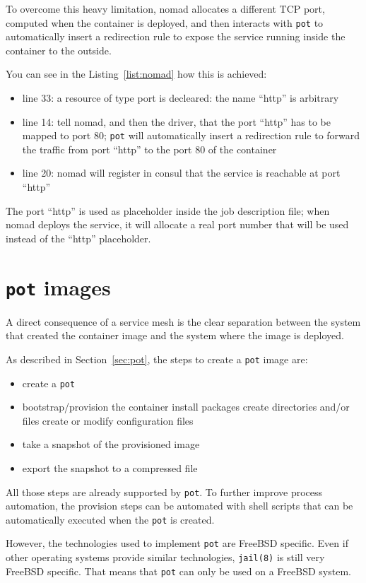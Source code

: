 \documentclass[conference,a4paper,11pt]{IEEEtran}
\begin{document}
To overcome this heavy limitation, nomad allocates a different TCP port, computed when the container is deployed, and then interacts with \texttt{pot} to automatically insert a redirection rule to expose the service running inside the container to the outside.

You can see in the Listing~\ref{list:nomad} how this is achieved:
\begin{itemize}
	\item line 33: a resource of type port is decleared: the name ``http'' is arbitrary
	\item line 14: tell nomad, and then the driver, that the port ``http'' has to be mapped to port 80; \texttt{pot} will automatically insert a redirection rule to forward the traffic from port ``http'' to the port 80 of the container
	\item line 20: nomad will register in consul that the service is reachable at port ``http''
\end{itemize}
The port ``http'' is used as placeholder inside the job description file; when nomad deploys the service, it will allocate a real port number that will be used instead of the ``http'' placeholder.

\section{\texttt{pot} images}\label{sec:Images}
A direct consequence of a service mesh is the clear separation between the system that created the container image and the system where the image is deployed.

As described in Section~\ref{sec:pot}, the steps to create a \texttt{pot} image are:
\begin{itemize}
	\item create a \texttt{pot}
	\item bootstrap/provision the container
		\subitem install packages
		\subitem create directories and/or files
		\subitem create or modify configuration files
	\item take a snapshot of the provisioned image
	\item export the snapshot to a compressed file
\end{itemize}

All those steps are already supported by \texttt{pot}. To further improve process automation, the provision steps can be automated with shell scripts that can be automatically executed when the \texttt{pot} is created.

However, the technologies used to implement \texttt{pot} are FreeBSD specific. Even if other operating systems provide similar technologies, \texttt{jail(8)} is still very FreeBSD specific. That means that \texttt{pot} can only be used on a FreeBSD system.
\end{document}
